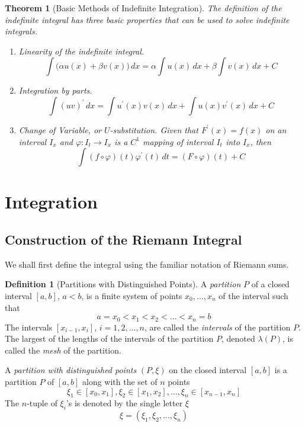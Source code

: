 \documentclass{article}
\newtheorem{theorem}{Theorem}[section]
\theoremstyle{remark}
\theoremstyle{definition}
\newtheorem{definition}{Definition}[section]
\begin{document}
\begin{theorem}[Basic Methods of Indefinite Integration]
The definition of the indefinite integral has three basic properties that can be used to solve indefinite integrals. 
\begin{enumerate}
    \item Linearity of the indefinite integral.
    \[\int \big( \alpha u(x) + \beta v(x)\big) \, dx = \alpha \int u(x)\,dx + \beta \int v(x)\,dx + C\]
    \item Integration by parts. 
    \[\int (u v)^\prime \,dx = \int u^\prime (x) v(x) \,dx + \int u(x) v^\prime (x) \,dx + C\]
    \item Change of Variable, or $U$-substitution. Given that $F^\prime (x) = f(x)$ on an interval $I_x$ and $\varphi: I_t \longrightarrow I_x$ is a $C^1$ mapping of interval $I_t$ into $I_x$, then
    \[\int (f \circ \varphi) (t) \varphi^\prime (t) \,dt = (F \circ \varphi)(t) + C\]
\end{enumerate}
\end{theorem}


\section{Integration}

\subsection{Construction of the Riemann Integral}
We shall first define the integral using the familiar notation of Riemann sums. 

\begin{definition}[Partitions with Distinguished Points]
A \textit{partition} $P$ of a closed interval $[a, b]$, $a < b$, is a finite system of points $x_0, \ldots, x_n$ of the interval such that
\[a = x_0 < x_1 < x_2 < \ldots < x_n = b\]
The intervals $[x_{i-1}, x_i]$, $i = 1, 2, \ldots, n$, are called the \textit{intervals} of the partition $P$. The largest of the lengths of the intervals of the partition $P$, denoted $\lambda(P)$, is called the \textit{mesh} of the partition. 

A \textit{partition with distinguished points} $(P, \xi)$ on the closed interval $[a, b]$ is a partition $P$ of $[a,b]$ along with the set of $n$ points 
\[\xi_1 \in [x_0, x_1], \xi_2 \in [x_1, x_2], \ldots, \xi_n \in [x_{n-1}, x_n]\]
The $n$-tuple of $\xi_i$'s is denoted by the single letter $\xi$
\[\xi = (\xi_1, \xi_2, \ldots, \xi_n)\]
\end{definition}
\end{document}
